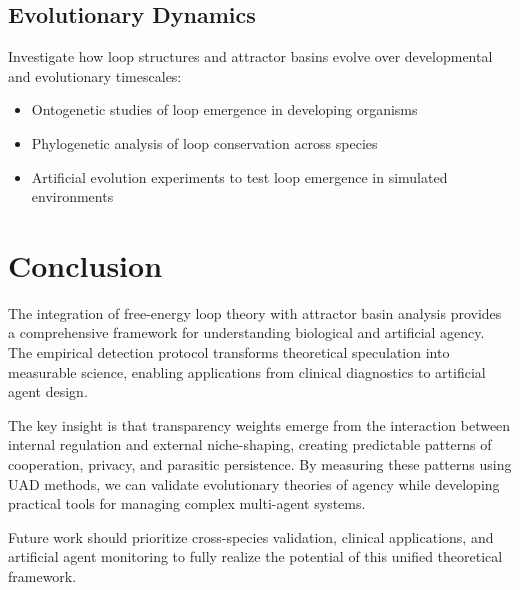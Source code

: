 \documentclass[10pt,conference]{IEEEtran}
\begin{document}
\subsection{Evolutionary Dynamics}
Investigate how loop structures and attractor basins evolve over developmental and evolutionary timescales:
\begin{itemize}
\item Ontogenetic studies of loop emergence in developing organisms
\item Phylogenetic analysis of loop conservation across species
\item Artificial evolution experiments to test loop emergence in simulated environments
\end{itemize}

\section{Conclusion}

The integration of free-energy loop theory with attractor basin analysis provides a comprehensive framework for understanding biological and artificial agency. The empirical detection protocol transforms theoretical speculation into measurable science, enabling applications from clinical diagnostics to artificial agent design.

The key insight is that transparency weights emerge from the interaction between internal regulation and external niche-shaping, creating predictable patterns of cooperation, privacy, and parasitic persistence. By measuring these patterns using UAD methods, we can validate evolutionary theories of agency while developing practical tools for managing complex multi-agent systems.

Future work should prioritize cross-species validation, clinical applications, and artificial agent monitoring to fully realize the potential of this unified theoretical framework.
\end{document}
